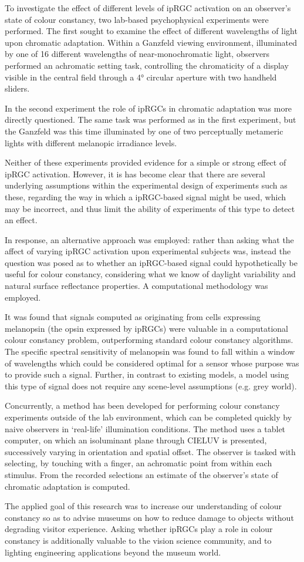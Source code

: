 \documentclass{article}
\begin{document}
To investigate the effect of different levels of ipRGC activation on an observer's state of colour constancy,	two lab-based psychophysical experiments were performed. The first sought to examine the effect of different wavelengths of light upon chromatic adaptation. Within a Ganzfeld viewing environment, illuminated by one of 16 different wavelengths of near-monochromatic light, observers performed an achromatic setting task, controlling the chromaticity of a display visible in the central field through a 4° circular aperture with two handheld sliders.

In the second experiment the role of ipRGCs in chromatic adaptation was more directly questioned. The same task was performed as in the first experiment, but the Ganzfeld was this time illuminated by one of two perceptually metameric lights with different melanopic irradiance levels. 

Neither of these experiments provided evidence for a simple or strong effect of ipRGC activation. However, it is has become clear that there are several underlying assumptions within the experimental design of experiments such as these, regarding the way in which a ipRGC-based signal might be used, which may be incorrect, and thus limit the ability of experiments of this type to detect an effect.

In response, an alternative approach was employed: rather than asking what the affect of varying ipRGC activation upon experimental subjects was, instead the question was posed as to whether an ipRGC-based signal could hypothetically be useful for colour constancy, considering what we know of daylight variability and natural surface reflectance properties. A computational methodology was employed. 

It was found that signals computed as originating from cells expressing melanopsin (the opsin expressed by ipRGCs) were valuable in a computational colour constancy problem, outperforming standard colour constancy algorithms. The specific spectral sensitivity of melanopsin was found to fall within a window of wavelengths which could be considered optimal for a sensor whose purpose was to provide such a signal. Further, in contrast to existing models, a model using this type of signal does not require any scene-level assumptions (e.g. grey world).

Concurrently, a method has been developed for performing colour constancy experiments outside of the lab environment, which can be completed quickly by naive observers in `real-life' illumination conditions. The method uses a tablet computer, on which an isoluminant plane through CIELUV is presented, successively varying in orientation and spatial offset. The observer is tasked with selecting, by touching with a finger, an achromatic point from within each stimulus. From the recorded selections an estimate of the observer's state of chromatic adaptation is computed.

The applied goal of this research was to increase our understanding of colour constancy so as to advise museums on how to reduce damage to objects without degrading visitor experience. Asking whether ipRGCs play a role in colour constancy is additionally valuable to the vision science community, and to lighting engineering applications beyond the museum world.
\end{document}
